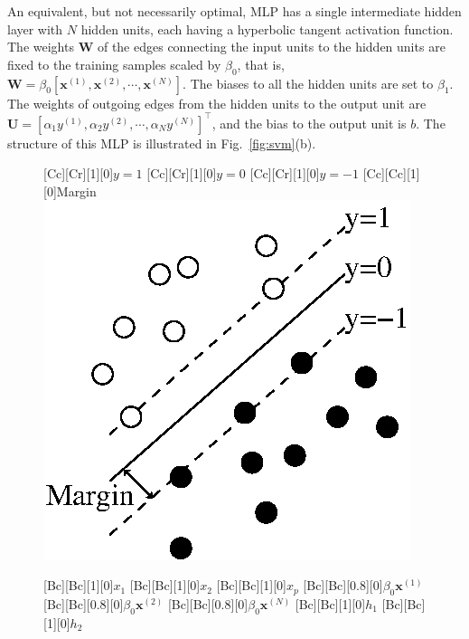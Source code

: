 \documentclass{now}
\newcommand{\vect}[1]{\mathbf{#1}}
\newcommand{\matr}[1]{\mathbf{#1}}
\newcommand{\vx}[0]{\vect{x}}
\newcommand{\mW}[0]{\matr{W}}
\newcommand{\mU}[0]{\matr{U}}
\begin{document}
An equivalent, but not necessarily optimal, MLP has a single intermediate hidden
layer with $N$ hidden units, each having a hyperbolic tangent activation
function. The weights $\mW$ of the edges connecting the input units to the
hidden units are fixed to the training samples scaled by $\beta_0$, that is,
$\mW = \beta_0 \left[ \vx^{(1)}, \vx^{(2)}, \cdots, \vx^{(N)} \right]$. The
biases to all the hidden units are set to $\beta_1$. The weights of outgoing
edges from the hidden units to the output unit are $\mU = \left[ \alpha_1
y^{(1)}, \alpha_2 y^{(2)}, \cdots, \alpha_N y^{(N)} \right]^\top$, and the bias
to the output unit is $b$. The structure of this MLP is illustrated in
Fig.~\ref{fig:svm}(b).

\begin{figure}[t]
    \begin{minipage}{0.48\textwidth}
        \centering
        [Cc][Cr][1][0]{$y=1$}
        [Cc][Cr][1][0]{$y=0$}
        [Cc][Cr][1][0]{$y=-1$}
        [Cc][Cc][1][0]{Margin}
        \includegraphics[width=0.75\columnwidth]{../figures/svm_maxmargin.eps}
    \end{minipage}
    \begin{minipage}{0.48\textwidth}
        \centering
        [Bc][Bc][1][0]{$x_1$}
        [Bc][Bc][1][0]{$x_2$}
        [Bc][Bc][1][0]{$x_p$}
        [Bc][Bc][0.8][0]{$\beta_0 \vx^{(1)}$}
        [Bc][Bc][0.8][0]{$\beta_0 \vx^{(2)}$}
        [Bc][Bc][0.8][0]{$\beta_0 \vx^{(N)}$}
        [Bc][Bc][1][0]{$h_1$}
        [Bc][Bc][1][0]{$h_2$}

\end{minipage}
\end{figure}
\end{document}
